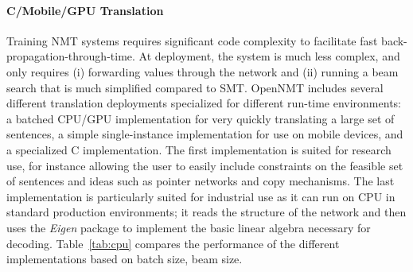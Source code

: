 \documentclass[]{article}
\begin{document}
\paragraph{C/Mobile/GPU Translation} Training NMT systems requires
significant code complexity to facilitate fast
back-propagation-through-time. At deployment, the system is much less
complex, and only requires (i) forwarding values through the network
and (ii) running a beam search that is much simplified compared to
SMT. OpenNMT includes several different translation deployments
specialized for different run-time environments: a batched CPU/GPU
implementation for very quickly translating a large set of sentences,
a simple single-instance implementation for use on mobile devices, and
a specialized C implementation. The first implementation is suited for
research use, for instance allowing the user to easily include
constraints on the feasible set of sentences and ideas such as pointer
networks and copy mechanisms. The last implementation is particularly
suited for industrial use as it can run on CPU in standard production
environments; it reads the structure of the network and then uses the
\textit{Eigen} package to implement the basic linear algebra necessary
for decoding. Table~\ref{tab:cpu} compares the performance of the
different implementations based on batch size, beam size.
\end{document}
